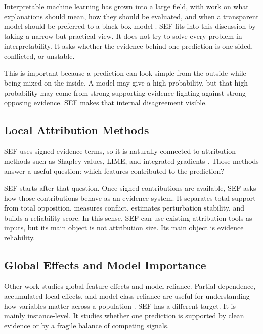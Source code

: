 \documentclass[11pt]{article}
\begin{document}
Interpretable machine learning has grown into a large field, with work on what explanations should mean, how they should be evaluated, and when a transparent model should be preferred to a black-box model \citep{doshi2017rigorous,murdoch2019definitions,rudin2019stop}. SEF fits into this discussion by taking a narrow but practical view. It does not try to solve every problem in interpretability. It asks whether the evidence behind one prediction is one-sided, conflicted, or unstable.

This is important because a prediction can look simple from the outside while being mixed on the inside. A model may give a high probability, but that high probability may come from strong supporting evidence fighting against strong opposing evidence. SEF makes that internal disagreement visible.

\subsection{Local Attribution Methods}

SEF uses signed evidence terms, so it is naturally connected to attribution methods such as Shapley values, LIME, and integrated gradients \citep{shapley1953value,lundberg2017unified,ribeiro2016why,sundararajan2017axiomatic}. Those methods answer a useful question: which features contributed to the prediction?

SEF starts after that question. Once signed contributions are available, SEF asks how those contributions behave as an evidence system. It separates total support from total opposition, measures conflict, estimates perturbation stability, and builds a reliability score. In this sense, SEF can use existing attribution tools as inputs, but its main object is not attribution size. Its main object is evidence reliability.

\subsection{Global Effects and Model Importance}

Other work studies global feature effects and model reliance. Partial dependence, accumulated local effects, and model-class reliance are useful for understanding how variables matter across a population \citep{apley2020visualizing,fisher2019all}. SEF has a different target. It is mainly instance-level. It studies whether one prediction is supported by clean evidence or by a fragile balance of competing signals.
\end{document}
